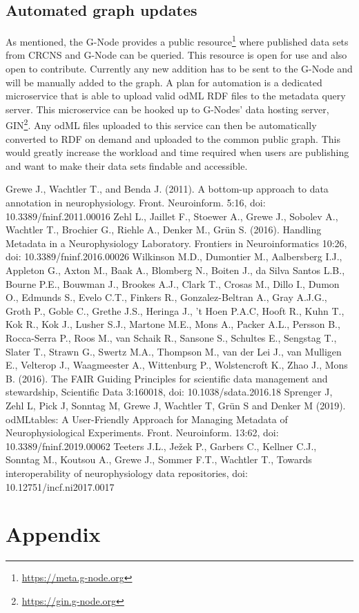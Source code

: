 \documentclass{article}
\begin{document}
\subsection{Automated graph updates}\label{sec:outlook_gin_integration}
As mentioned, the G-Node provides a public resource\footnote{\url{https://meta.g-node.org}} where published data sets from CRCNS and G-Node can be queried. This resource is open for use and also open to contribute. Currently any new addition has to be sent to the G-Node and will be manually added to the graph. A plan for automation is a dedicated microservice that is able to upload valid odML RDF files to the metadata query server. This microservice can be hooked up to G-Nodes' data hosting server, GIN\footnote{\url{https://gin.g-node.org}}. Any odML files uploaded to this service can then be automatically converted to RDF on demand and uploaded to the common public graph. This would greatly increase the workload and time required when users are publishing and want to make their data sets findable and accessible.

\begin{thebibliography}{}
Grewe J., Wachtler T., and Benda J. (2011). A bottom-up approach to data annotation in neurophysiology. Front. Neuroinform. 5:16, doi: 10.3389/fninf.2011.00016
Zehl L., Jaillet F., Stoewer A., Grewe J., Sobolev A., Wachtler T., Brochier G., Riehle A., Denker M., Grün S. (2016). Handling Metadata in a Neurophysiology Laboratory. Frontiers in Neuroinformatics 10:26, doi: 10.3389/fninf.2016.00026
Wilkinson M.D., Dumontier M., Aalbersberg I.J., Appleton G., Axton M., Baak A., Blomberg N., Boiten J., da Silva Santos L.B., Bourne P.E., Bouwman J., Brookes A.J., Clark T., Crosas M., Dillo I., Dumon O., Edmunds S., Evelo C.T., Finkers R., Gonzalez-Beltran A., Gray A.J.G., Groth P., Goble C., Grethe J.S., Heringa J., ’t Hoen P.A.C, Hooft R., Kuhn T., Kok R., Kok J., Lusher S.J., Martone M.E., Mons A., Packer A.L., Persson B., Rocca-Serra P., Roos M., van Schaik R., Sansone S., Schultes E., Sengstag T., Slater T., Strawn G., Swertz M.A., Thompson M., van der Lei J., van Mulligen E., Velterop J., Waagmeester A., Wittenburg P., Wolstencroft K., Zhao J., Mons B. (2016). The FAIR Guiding Principles for scientific data management and stewardship, Scientific Data 3:160018, doi: 10.1038/sdata.2016.18
Sprenger J, Zehl L, Pick J, Sonntag M, Grewe J, Wachtler T, Grün S and Denker M (2019). odMLtables: A User-Friendly Approach for Managing Metadata of Neurophysiological Experiments. Front. Neuroinform. 13:62, doi: 10.3389/fninf.2019.00062
Teeters J.L., Ježek P., Garbers C., Kellner C.J., Sonntag M., Koutsou A., Grewe J., Sommer F.T., Wachtler T., Towards interoperability of neurophysiology data repositories, doi: 10.12751/incf.ni2017.0017
\end{thebibliography}

\section{Appendix} \label{sec:appendix}


\end{document}
